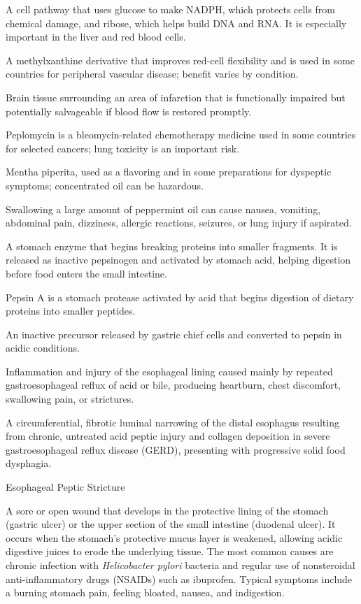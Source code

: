  A cell pathway that uses glucose to make NADPH, which protects cells from chemical damage, and ribose, which helps build DNA and RNA. It is especially important in the liver and red blood cells.

 A methylxanthine derivative that improves red-cell flexibility and is used in some countries for peripheral vascular disease; benefit varies by condition.

 Brain tissue surrounding an area of infarction that is functionally impaired but potentially salvageable if blood flow is restored promptly.

 Peplomycin is a bleomycin-related chemotherapy medicine used in some countries for selected cancers; lung toxicity is an important risk.

 Mentha piperita, used as a flavoring and in some preparations for dyspeptic symptoms; concentrated oil can be hazardous.

 Swallowing a large amount of peppermint oil can cause nausea, vomiting, abdominal pain, dizziness, allergic reactions, seizures, or lung injury if aspirated.

 A stomach enzyme that begins breaking proteins into smaller fragments. It is released as inactive pepsinogen and activated by stomach acid, helping digestion before food enters the small intestine.

 Pepsin A is a stomach protease activated by acid that begins digestion of dietary proteins into smaller peptides.

 An inactive precursor released by gastric chief cells and converted to pepsin in acidic conditions.

 Inflammation and injury of the esophageal lining caused mainly by repeated gastroesophageal reflux of acid or bile, producing heartburn, chest discomfort, swallowing pain, or strictures.

 A circumferential, fibrotic luminal narrowing of the distal esophagus resulting from chronic, untreated acid peptic injury and collagen deposition in severe gastroesophageal reflux disease (GERD), presenting with progressive solid food dysphagia.

\synonyms
Esophageal Peptic Stricture

 A sore or open wound that develops in the protective lining of the stomach (gastric ulcer) or the upper section of the small intestine (duodenal ulcer). It occurs when the stomach's protective mucus layer is weakened, allowing acidic digestive juices to erode the underlying tissue. The most common causes are chronic infection with \textit{Helicobacter pylori} bacteria and regular use of nonsteroidal anti-inflammatory drugs (NSAIDs) such as ibuprofen. Typical symptoms include a burning stomach pain, feeling bloated, nausea, and indigestion.

